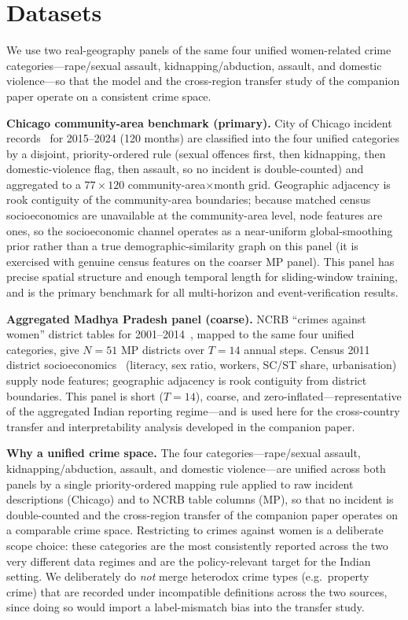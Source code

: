 \documentclass[11pt,conference]{IEEEtran}
\begin{document}


\section{Datasets}\label{sec:data}
We use two real-geography panels of the same four unified women-related crime
categories---rape/sexual assault, kidnapping/abduction, assault, and domestic
violence---so that the model and the cross-region transfer study of the
companion paper operate on a consistent crime space.

\textbf{Chicago community-area benchmark (primary).} City of Chicago incident
records~\cite{chicagoportal} for 2015--2024 (120 months) are classified into
the four unified categories by a disjoint, priority-ordered rule (sexual
offences first, then kidnapping, then domestic-violence flag, then assault, so
no incident is double-counted) and aggregated to a $77\times120$
community-area$\times$month grid. Geographic adjacency is rook contiguity of
the community-area boundaries; because matched census socioeconomics are
unavailable at the community-area level, node features are ones, so the
socioeconomic channel operates as a near-uniform global-smoothing prior rather
than a true demographic-similarity graph on this panel (it is exercised with
genuine census features on the coarser MP panel). This panel has precise
spatial structure and enough temporal length
for sliding-window training, and is the primary benchmark for all
multi-horizon and event-verification results.

\textbf{Aggregated Madhya Pradesh panel (coarse).} NCRB ``crimes against
women'' district tables for 2001--2014~\cite{ncrb_cii}, mapped to the same
four unified categories, give $N{=}51$ MP districts over $T{=}14$ annual
steps. Census 2011 district socioeconomics~\cite{census2011} (literacy, sex
ratio, workers, SC/ST share, urbanisation) supply node features; geographic
adjacency is rook contiguity from district boundaries. This panel is short
($T{=}14$), coarse, and zero-inflated---representative of the aggregated Indian
reporting regime---and is used here for the cross-country transfer and
interpretability analysis developed in the companion paper.

\textbf{Why a unified crime space.} The four categories---rape/sexual assault,
kidnapping/abduction, assault, and domestic violence---are unified across both
panels by a single priority-ordered mapping rule applied to raw incident
descriptions (Chicago) and to NCRB table columns (MP), so that no incident is
double-counted and the cross-region transfer of the companion paper operates on
a comparable crime space. Restricting to crimes against women is a deliberate
scope choice: these categories are the most consistently reported across the two
very different data regimes and are the policy-relevant target for the Indian
setting. We deliberately do \emph{not} merge heterodox crime types (e.g.\
property crime) that are recorded under incompatible definitions across the two
sources, since doing so would import a label-mismatch bias into the transfer
study.
\end{document}
